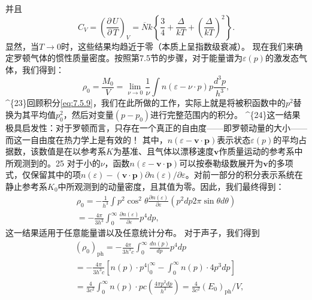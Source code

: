 并且
\begin{equation}\tag{7.5.32}\label{eq:7.5.32}
C _ { V } = \left( \frac { \partial \, U } { \partial \, T } \right) _ { V } = \overline { { { N } } } k \left\{ \frac { 3 } { 4 } + \frac { \Delta } { k T } + \left( \frac { \Delta } { k T } \right) ^{2} \right\} .
\end{equation}
显然，当\(T \rightarrow 0\)时，这些结果均趋近于零（本质上呈指数级衰减）。
现在我们来确定罗顿气体的惯性质量密度。按照第7.5节的步骤，对于能量谱为\(\varepsilon(p)\)的激发态气体，我们得到：
\begin{equation}\tag{7.5.33}\label{eq:7.5.33}
\rho _ { 0 } = \frac { M _ { 0 } } { V } = \operatorname* { l i m } _ { \nu \to 0 } \frac { 1 } { \nu } \int n ( \varepsilon - \nu \cdot p ) p \frac { d ^{3} p } { h ^{3} } ,
\end{equation}
\^{}\{23\}回顾积分\autoref{eq:7.5.9}，我们在此所做的工作，实际上就是将被积函数中的\(p^{2}\)替换为其平均值\(p_{0}^{2}\)，然后对变量\((p-p_{0})\)进行完整范围内的积分。
\^{}\{24\}这一结果极具启发性：对于罗顿而言，只存在一个真正的自由度——即罗顿动量的大小——而这一自由度在热力学上是有效的！
其中，\(n(\varepsilon - \boldsymbol{v} \cdot \boldsymbol{p})\)表示状态\(\varepsilon(p)\)的平均占据数，该数值是在以参考系\(K\)为基准、且气体以漂移速度\(\boldsymbol{v}\)作质量运动的参考系中所观测到的。25 对于小的\(\nu\)，函数\(n(\varepsilon - \boldsymbol{v} \cdot \boldsymbol{p})\)可以按泰勒级数展开为\(\boldsymbol{v}\)的多项式，仅保留其中的项\(n(\varepsilon) - (\boldsymbol{v} \cdot \boldsymbol{p})\partial n(\varepsilon)/\partial \varepsilon\)。对前一部分的积分表示系统在静止参考系\(K_0\)中所观测到的动量密度，且其值为零。因此，我们最终得到：
\begin{equation}\tag{7.5.34}\label{eq:7.5.34}
\begin{array}{r} { \rho _ { 0 } = - \frac { 1 } { h ^{3} } \int p ^{2} \cos ^{2} \theta \frac { \partial n ( \varepsilon ) } { \partial \varepsilon } ( p ^{2} d p 2 \pi \sin \theta d \theta ) } \\{ = - \frac { 4 \pi } { 3 h ^{3} } \int _ { 0 } ^{\infty} \frac { \partial n ( \varepsilon ) } { \partial \varepsilon } p ^{4} d p , } \end{array}
\end{equation}
这一结果适用于任意能量谱以及任意统计分布。
对于声子，我们得到
\begin{equation}\tag{7.5.35}\label{eq:7.5.35}
\begin{array}{rl} & { ( \rho _ { 0 } ) _ { \mathrm { p h } } = - \frac { 4 \pi } { 3 h ^{3} c } \int _ { 0 } ^{\infty} \frac { d n ( p ) } { d p } p ^{4} d p } \\& {  = - \frac { 4 \pi } { 3 h ^{3} c } \left[ n ( p ) \cdot p ^{4} \Big | _ { 0 } ^{\infty} - \int _ { 0 } ^{\infty} n ( p ) \cdot 4 p ^{3} d p \right] } \\& {  = \frac { 4 } { 3 c ^{2} } \int _ { 0 } ^{\infty} n ( p ) \cdot p c \left( \frac { 4 \pi p ^{2} d p } { h ^{3} } \right) = \frac { 4 } { 3 c ^{2} } ( E _ { 0 } ) _ { \mathrm { p h } } / V , } \end{array}
\end{equation}
